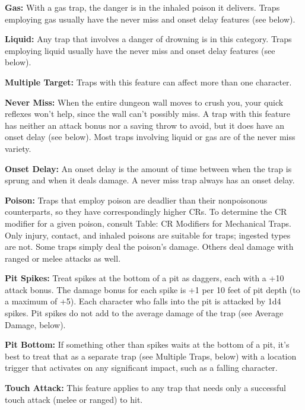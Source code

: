\textbf{Gas:} With a gas trap, the danger is in the inhaled poison it delivers. Traps employing gas usually have the never miss and onset delay features (see below).

\textbf{Liquid:} Any trap that involves a danger of drowning is in this category. Traps employing liquid usually have the never miss and onset delay features (see below).

\textbf{Multiple Target:} Traps with this feature can affect more than one character.

\textbf{Never Miss:} When the entire dungeon wall moves to crush you, your quick reflexes won’t help, since the wall can’t possibly miss. A trap with this feature has neither an attack bonus nor a saving throw to avoid, but it does have an onset delay (see below). Most traps involving liquid or gas are of the never miss variety.

\textbf{Onset Delay:} An onset delay is the amount of time between when the trap is sprung and when it deals damage. A never miss trap always has an onset delay.

\textbf{Poison:} Traps that employ poison are deadlier than their nonpoisonous counterparts, so they have correspondingly higher CRs. To determine the CR modifier for a given poison, consult Table: CR Modifiers for Mechanical Traps. Only injury, contact, and inhaled poisons are suitable for traps; ingested types are not. Some traps simply deal the poison’s damage. Others deal damage with ranged or melee attacks as well.

\textbf{Pit Spikes:} Treat spikes at the bottom of a pit as daggers, each with a +10 attack bonus. The damage bonus for each spike is +1 per 10 feet of pit depth (to a maximum of +5). Each character who falls into the pit is attacked by 1d4 spikes. Pit spikes do not add to the average damage of the trap (see Average Damage, below).

\textbf{Pit Bottom:} If something other than spikes waits at the bottom of a pit, it’s best to treat that as a separate trap (see Multiple Traps, below) with a location trigger that activates on any significant impact, such as a falling character.

\textbf{Touch Attack:} This feature applies to any trap that needs only a successful touch attack (melee or ranged) to hit.